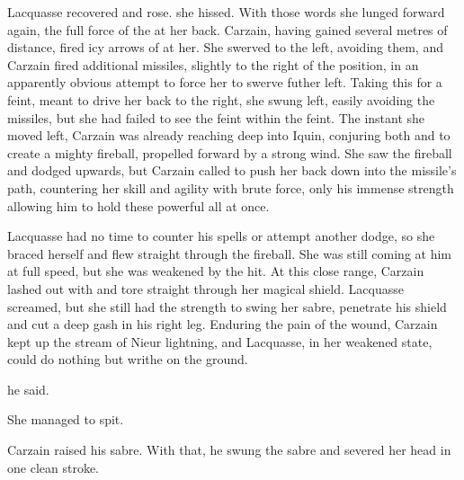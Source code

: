 Lacquasse recovered and rose.  she hissed.  With those words she lunged forward again, the full force of the \Sephirah{} at her back. Carzain, having gained several metres of distance, fired icy arrows of \Horvaleth{} at her. She swerved to the left, avoiding them, and Carzain fired additional missiles, slightly to the right of the position, in an apparently obvious attempt to force her to swerve futher left. Taking this for a feint, meant to drive her back to the right, she swung left, easily avoiding the missiles, but she had failed to see the feint within the feint. The instant she moved left, Carzain was already reaching deep into Iquin, conjuring both \Izion{} and \Feazin{} to create a mighty fireball, propelled forward by a strong wind. She saw the fireball and dodged upwards, but Carzain called \Feazin{} to push her back down into the missile's path, countering her skill and agility with brute force, only his immense strength allowing him to hold these powerful \Sephiroth{} all at once. 

Lacquasse had no time to counter his spells or attempt another dodge, so she braced herself and flew straight through the fireball. She was still coming at him at full speed, but she was weakened by the hit. At this close range, Carzain lashed out with \Nyxachel{} and tore straight through her magical shield. Lacquasse screamed, but she still had the strength to swing her sabre, penetrate his shield and cut a deep gash in his right leg. Enduring the pain of the wound, Carzain kept up the stream of Nieur lightning, and Lacquasse, in her weakened state, could do nothing but writhe on the ground. 

 he said.  

She managed to spit.  

 Carzain raised his sabre.  With that, he swung the sabre and severed her head in one clean stroke. 



